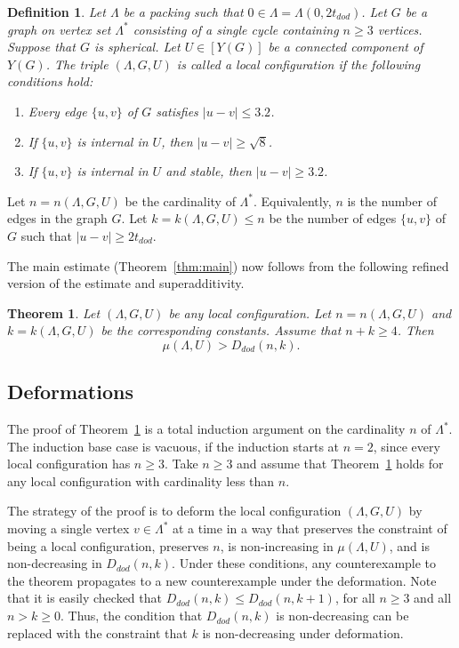 \documentclass{article} %
\newtheorem{theorem}{Theorem}[section]
\newtheorem{definition}[lemma]{Definition}
\begin{document}
\begin{definition}
Let $\Lambda$ be a packing such that $0\in\Lambda=\Lambda(0,2t_{dod})$.  
Let $G$ be a graph on vertex set $\Lambda^*$ 
consisting
of a single cycle containing $n\ge 3$ vertices.  
Suppose that $G$ is spherical. 
Let $U\in [Y(G)]$ be a connected component of $Y(G)$.  
The triple $(\Lambda,G,U)$ is called a {\it local configuration} if the
following conditions hold:
\begin{enumerate}
\item Every edge $\{u,v\}$ of $G$ satisfies $|u-v|\le 3.2$.
\item If
$\{u,v\}$ is internal in  $U$, then $|u-v|\ge \sqrt8$.
\item If $\{u,v\}$ is internal in $U$ and stable,
then $|u-v|\ge 3.2$.
\end{enumerate}
\end{definition}


Let $n=n(\Lambda,G,U)$ be the cardinality of $\Lambda^*$.  Equivalently,
$n$ is the number of edges in the graph $G$.  Let
$k=k(\Lambda,G,U)\le n$ be the number of edges $\{u,v\}$ of $G$ such
that $|u-v|\ge 2t_{dod}$. 

The main estimate (Theorem~\ref{thm:main}) now follows from the following
refined version of the estimate and superadditivity.

\begin{theorem}\label{thm:main'}  
Let $(\Lambda,G,U)$ be any local configuration.
Let $n=n(\Lambda,G,U)$ and $k=k(\Lambda,G,U)$ be the corresponding constants.
Assume that $n+k\ge 4$.  Then
   $$
   \mu(\Lambda,U) > D_{dod}(n,k).
   $$
\end{theorem}

\subsection{Deformations}

The proof of Theorem~\ref{thm:main'} is a total induction argument on
the cardinality $n$ of $\Lambda^*$. The induction base case is
vacuous, if the induction starts at $n=2$, since every local
configuration has $n\ge 3$. Take $n\ge 3$ and assume that
Theorem~\ref{thm:main'} holds for any local configuration with
cardinality less than $n$.

The strategy of the proof is to deform the local configuration
$(\Lambda,G,U)$ by moving a single vertex $v\in\Lambda^*$ at a time in
a way that preserves the constraint of being a local configuration,
preserves $n$, is non-increasing in $\mu(\Lambda,U)$, and is
non-decreasing in $D_{dod}(n,k)$. Under these conditions, any
counterexample to the theorem propagates to a new counterexample under
the deformation. Note that it is easily checked that $D_{dod}(n,k) \le
D_{dod}(n,k+1)$, for all $n\ge 3$ and all $n> k\ge0$. Thus, the
condition that $D_{dod}(n,k)$ is non-decreasing can be replaced with
the constraint that $k$ is non-decreasing under deformation.
\end{document}
